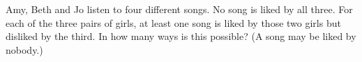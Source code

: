 Amy, Beth and Jo listen to four different songs. No song is liked by all three. For each of the three pairs of girls, at least one song is liked by those two girls but disliked by the third. In how many ways is this possible? (A song may be liked by nobody.)
